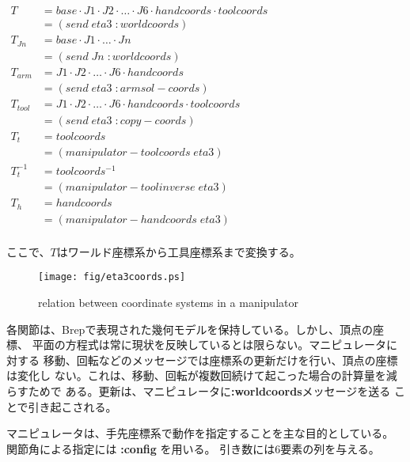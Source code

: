 $
\begin{array}{ll}
T & = base \cdot J1 \cdot J2 \cdot \ldots 
\cdot J6 \cdot handcoords \cdot toolcoords \\ 
 & = (send \; eta3 \; :worldcoords) \\ 
T_{Jn} & = base \cdot J1\cdot \ldots \cdot Jn \\
 & = (send \; Jn \; :worldcoords) \\
T_{arm} & = J1 \cdot J2 \cdot \ldots \cdot J6 \cdot handcoords \\ 
 & = (send \; eta3 \; :armsol-coords) \\ 
T_{tool} & = J1 \cdot J2 \cdot  \ldots \cdot J6 \cdot handcoords \cdot toolcoords \\ 
 & = (send \; eta3 \; :copy-coords) \\
T_{t} & = toolcoords \\ 
 & = (manipulator-toolcoords \; eta3)\\
T_{t}^{-1} & = toolcoords^{-1} \\ 
 & = (manipulator-toolinverse \; eta3) \\
T_{h} & = handcoords \\ 
 & = (manipulator-handcoords \; eta3)\\
\end{array}$

ここで、$T$はワールド座標系から工具座標系まで変換する。

\begin{figure}
\begin{center}
\texttt{[image: fig/eta3coords.ps]}
\end{center}
\caption{\label{JointCoords}
relation between coordinate systems in a manipulator}

\end{figure}


各関節は、Brepで表現された幾何モデルを保持している。しかし、頂点の座標、
平面の方程式は常に現状を反映しているとは限らない。マニピュレータに対する
移動、回転などのメッセージでは座標系の更新だけを行い、頂点の座標は変化し
ない。これは、移動、回転が複数回続けて起こった場合の計算量を減らすためで
ある。更新は、マニピュレータに{\bf :worldcoords}メッセージを送る
ことで引き起こされる。


マニピュレータは、手先座標系で動作を指定することを主な目的としている。
関節角による指定には {\bf :config} を用いる。
引き数には6要素の列を与える。

